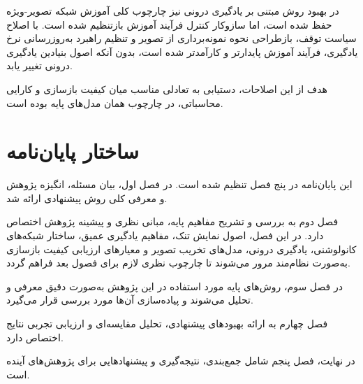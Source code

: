 در بهبود روش مبتنی بر یادگیری درونی نیز چارچوب کلی آموزش شبکه تصویر-ویژه حفظ شده است، اما سازوکار کنترل فرآیند آموزش بازتنظیم شده است. با اصلاح سیاست توقف، بازطراحی نحوه نمونه‌برداری از تصویر و تنظیم راهبرد به‌روزرسانی نرخ یادگیری، فرآیند آموزش پایدارتر و کارآمدتر شده است، بدون آنکه اصول بنیادین یادگیری درونی تغییر یابد.

هدف از این اصلاحات، دستیابی به تعادلی مناسب میان کیفیت بازسازی و کارایی محاسباتی، در چارچوب همان مدل‌های پایه بوده است.

\section{ساختار پایان‌نامه}

این پایان‌نامه در پنج فصل تنظیم شده است. در فصل اول، بیان مسئله، انگیزه پژوهش و معرفی کلی روش پیشنهادی ارائه شد.  

فصل دوم به بررسی و تشریح مفاهیم پایه، مبانی نظری و پیشینه پژوهش اختصاص دارد. در این فصل، اصول نمایش تنک، مفاهیم یادگیری عمیق، ساختار شبکه‌های کانولوشنی، یادگیری درونی، مدل‌های تخریب تصویر و معیارهای ارزیابی کیفیت بازسازی به‌صورت نظام‌مند مرور می‌شوند تا چارچوب نظری لازم برای فصول بعد فراهم گردد.

در فصل سوم، روش‌های پایه مورد استفاده در این پژوهش به‌صورت دقیق معرفی و تحلیل می‌شوند و پیاده‌سازی آن‌ها مورد بررسی قرار می‌گیرد.  

فصل چهارم به ارائه بهبودهای پیشنهادی، تحلیل مقایسه‌ای و ارزیابی تجربی نتایج اختصاص دارد.  

در نهایت، فصل پنجم شامل جمع‌بندی، نتیجه‌گیری و پیشنهادهایی برای پژوهش‌های آینده است.